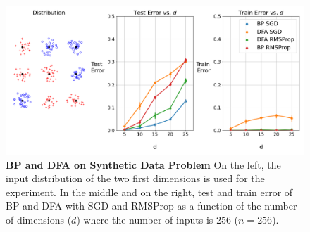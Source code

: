 \documentclass[a4paper, nobind]{templates/ociamthesis}
\begin{document}
\begin{figure}

{\centering \includegraphics[width=1\linewidth]{figures/3_syntheticData_adaptive} 

}

\caption[BP and DFA on Synthetic Data Problem]{\textbf{BP and DFA on Synthetic Data Problem} \newline On the left, the input distribution of the two first dimensions is used for the experiment. In the middle and on the right, test and train error of BP and DFA with SGD and RMSProp as a function of the number of dimensions ($d$) where the number of inputs is $256$ ($n = 256$).}\label{fig:DFARandom}
\end{figure}
\end{document}
